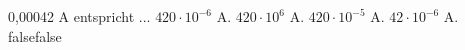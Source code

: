     {0,00042 A entspricht ...}
    {$420\cdot 10^{-6}$ A.}
    {$420\cdot 10^6$ A.}
    {$420\cdot 10^{-5}$ A.}
    {$42\cdot 10^{-6}$ A.}
    {false}{false}